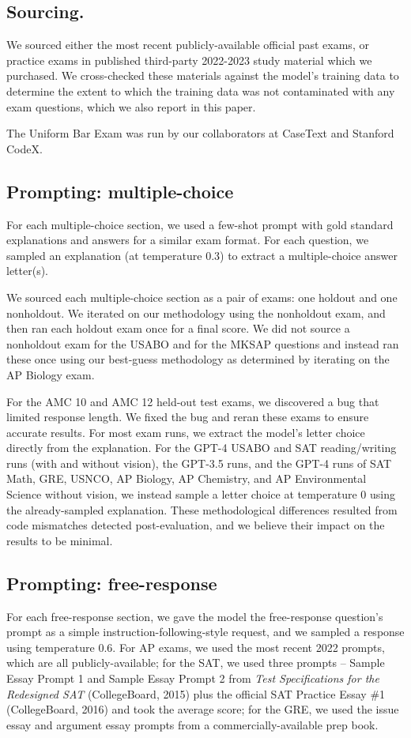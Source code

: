 \documentclass{article}
\begin{document}
\subsection{Sourcing.} We sourced either the most recent publicly-available official past exams, or practice exams in published third-party 2022-2023 study material which we purchased. We cross-checked these materials against the model's training data to determine the extent to which the training data was not contaminated with any exam questions, which we also report in this paper.

The Uniform Bar Exam was run by our collaborators at CaseText and Stanford CodeX.

\subsection{Prompting: multiple-choice} \label{appendix:exam_mcq_prompting} For each multiple-choice section, we used a few-shot prompt with gold standard explanations and answers for a similar exam format. For each question, we sampled an explanation (at temperature 0.3) to extract a multiple-choice answer letter(s). 

We sourced each multiple-choice section as a pair of exams: one holdout and one nonholdout. We iterated on our methodology using the nonholdout exam, and then ran each holdout exam once for a final score. We did not source a nonholdout exam for the USABO and for the MKSAP questions and instead ran these once using our best-guess methodology as determined by iterating on the AP Biology exam.

For the AMC 10 and AMC 12 held-out test exams, we discovered a bug that limited response length. We fixed the bug and reran these exams to ensure accurate results. For most exam runs, we extract the model's letter choice directly from the explanation. For the GPT-4 USABO and SAT reading/writing runs (with and without vision), the GPT-3.5 runs, and the GPT-4 runs of SAT Math, GRE, USNCO, AP Biology, AP Chemistry, and AP Environmental Science without vision, we instead sample a letter choice at temperature 0 using the already-sampled explanation. These methodological differences resulted from code mismatches detected post-evaluation, and we believe their impact on the results to be minimal.

\subsection{Prompting: free-response}
For each free-response section, we gave the model the free-response question's prompt as a simple instruction-following-style request, and we sampled a response using temperature 0.6. For AP exams, we used the most recent 2022 prompts, which are all publicly-available; for the SAT, we used three prompts – Sample Essay Prompt 1 and Sample Essay Prompt 2 from \textit{Test Specifications for the Redesigned SAT} (CollegeBoard, 2015) plus the official SAT Practice Essay \#1 (CollegeBoard, 2016) and took the average score; for the GRE, we used the issue essay and argument essay prompts from a commercially-available prep book.
\end{document}

